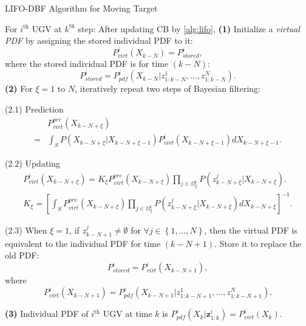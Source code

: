 \documentclass[journal]{IEEEtranTIE}
\theoremstyle{remark}
\newcommand{\X}{X}
\begin{document}
	
	\begin{algorithm}
		\caption{LIFO-DBF Algorithm for Moving Target}\label{alg:lifo-dbf}
		\begin{algorithmic}
			\State For $i^\text{th}$ UGV at $k^\text{th}$ step:
			\State After updating CB by \cref{alg:lifo},	
			\State\textbf{(1)} Initialize a \textit{virtual PDF} by assigning the stored individual PDF to it:
			\small\begin{equation*}
				P^i_{virt}(\X_{k-N})= P^i_{stored},
			\end{equation*}\normalsize		
			where the stored individual PDF is for time $(k-N)$:
			\small\begin{equation*}
				P^i_{stored} = P^i_{pdf}(\X_{k-N}|z^1_{1:k-N},\dots,z^N_{1:k-N}).
			\end{equation*}\normalsize	
			\State\textbf{(2)} For $\xi=1$ to $N$, iteratively repeat two steps of Bayesian filtering:
			
			\State(2.1) Prediction 
			\small\begin{align*}
				&P_{virt}^{pre}(\X_{k-N+\xi})\\=&\int_{S} P(\X_{k-N+\xi}|\X_{k-N+\xi-1})P^i_{virt}(\X_{k-N+\xi-1})d\X_{k-N+\xi-1}.
			\end{align*} \normalsize
			
			\State(2.2) Updating
			\small\begin{gather*}
				P^i_{virt}(\X_{k-N+\xi})=K_\xi P_{virt}^{pre}(\X_{k-N+\xi})\prod\limits_{j\in\Omega^i_{\xi}}P(z^j_{k-N+\xi}|\X_{k-N+\xi}).\\
				K_\xi=\left[\int_S P_{virt}^{pre}(\X_{k-N+\xi})\prod\limits_{j\in\Omega^i_{\xi}}P(z^j_{k-N+\xi}|\X_{k-N+\xi})d\X_{k-N+\xi}\right]^{-1}.
			\end{gather*} \normalsize
			
			\State(2.3) When $\xi=1$, if $z^j_{k-N+1}\neq\emptyset$ for $\forall j\in \left\lbrace1,\dots,N\right\rbrace$, then the virtual PDF is equivalent to the individual PDF for time $(k-N+1)$. Store it to replace the old PDF:
			\small\begin{equation*}
				P^i_{stored}=P^i_{virt}(\X_{k-N+1}),
			\end{equation*}\normalsize
			where 
			\small\begin{equation*}
				P^i_{virt}(\X_{k-N+1})=P^i_{pdf}(\X_{k-N+1}|z^1_{1:k-N+1},\dots,z^N_{1:k-N+1}).
			\end{equation*}\normalsize
			
			\State\textbf{(3)} Individual PDF of $i^\text{th}$ UGV at time $k$ is
			$P^i_{pdf}(\X_{k}|\mathbf{z}^{i}_{1:k})=P^i_{virt}(\X_k)$.		
		\end{algorithmic}
	\end{algorithm}
	
\end{document}
